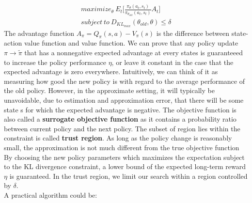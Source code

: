 \documentclass[11pt]{article}
\begin{document}
\begin{equation}
        \begin{split}
        maximize_{\theta} \ E_t\Big[\frac{\pi_{\theta}(a_t, s_t)}{\pi_{\theta_{old}}(a_t, s_t)}A_t\Big]
        \\ \label{eq:2}
        subject \  to \ D_{KL_{max}}(\theta_{old}, \theta) \leq \delta
        \end{split}
\end{equation}
The advantage function $A_{\pi} = Q_{\pi}(s, a) - V_{\pi}(s)$ is the difference between
state-action value function and value function. We can prove that any policy update $\pi
\rightarrow \tilde{\pi}$ that has a nonnegative expected advantage at every states is
guaranteeed to increase the policy performance $\eta$, or leave it constant in the case
that the expected advantage is zero everywhere. Intuitively, we can think of it as
measuring how good the new policy is with regard to the average performance of the old
policy. However, in the approximate setting, it will typically be unavoidable, due to
estimation and approximation error, that there will be some state s for which the expected
advantage is negative.
The objective function is also called a \textbf{surrogate objective function} as it contains a
probability ratio between current policy and the next policy. The subset of region lies
within the constraint is called \textbf{trust region}. As long as the policy change is reasonably
small, the approximation is not much different from the true objective function By
choosing the new policy parameters which maximizes the expectation subject to the KL
divergence constraint, a lower bound of the expected long-term reward $\eta$ is guaranteed.
In the trust region, we limit our search within a region controlled by $\delta$.
\\
A practical algorithm could be:
\end{document}
